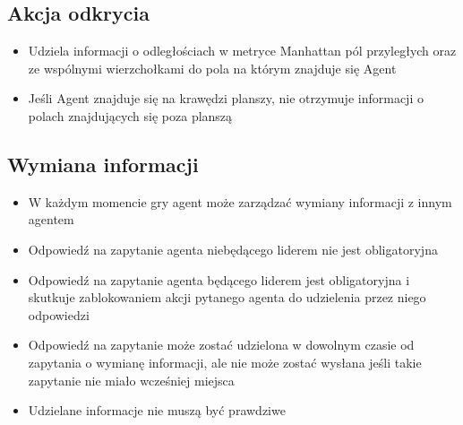 \documentclass[Dokumentacja.tex]{subfiles}
\begin{document}
\subsection{Akcja odkrycia}
\begin{itemize}
    \item Udziela informacji o odległościach w metryce Manhattan pól przyległych oraz ze wspólnymi wierzchołkami do pola na którym znajduje się Agent
    \item Jeśli Agent znajduje się na krawędzi planszy, nie otrzymuje informacji o polach znajdujących się poza planszą
\end{itemize}
\subsection{Wymiana informacji}
\begin{itemize}
    \item W każdym momencie gry agent może zarządzać wymiany informacji z innym agentem
    \item Odpowiedź na zapytanie agenta niebędącego liderem nie jest obligatoryjna
    \item Odpowiedź na zapytanie agenta będącego liderem jest obligatoryjna i skutkuje zablokowaniem akcji pytanego agenta do udzielenia przez niego odpowiedzi
    \item Odpowiedź na zapytanie może zostać udzielona w dowolnym czasie od zapytania o wymianę informacji, ale nie może zostać wysłana jeśli takie zapytanie nie miało wcześniej miejsca
    \item Udzielane informacje nie muszą być prawdziwe
\end{itemize}
\end{document}
